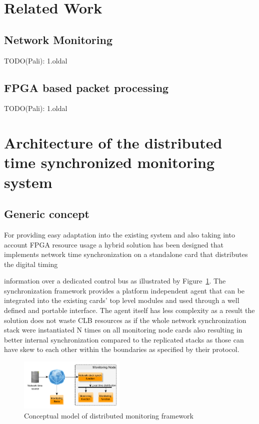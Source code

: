 \documentclass[article]{IEEEtran}
\begin{document}
\section{Related Work}

\subsection{Network Monitoring}
TODO(Pali): 1.oldal

\subsection{FPGA based packet processing}
TODO(Pali): 1.oldal

\IEEEpubidadjcol

\section{Architecture of the distributed time synchronized monitoring system}

\subsection{Generic concept}
For providing easy adaptation into the existing system and also taking into account FPGA resource usage a hybrid
solution
has been designed that implements network time synchronization on a standalone card that distributes the digital timing

information over a dedicated control bus as illustrated by Figure~\ref{fig:concept}.
The synchronization framework provides a platform independent agent that
can be integrated into the existing cards' top level modules and used through a well defined and portable interface.
The agent itself has less complexity as a result the solution does not waste CLB resources as if the whole network
synchronization stack were instantiated N times on all monitoring node cards also resulting in better internal
synchronization
compared to the replicated stacks as those can have skew to each other within the boundaries as specified by their
protocol.

\begin{figure}[!htb]
    \centering
    \includegraphics[width=0.45\textwidth]{figures_raw/concept.png}
    \caption{Conceptual model of distributed monitoring framework}
    \label{fig:concept}
\end{figure}
\end{document}
